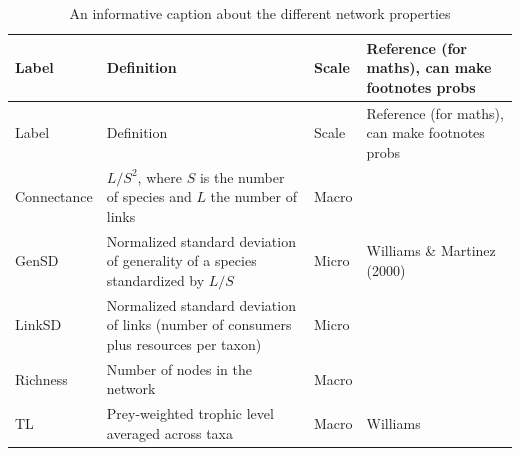 \documentclass[
]{article}
\begin{document}
\begin{longtable}[]{@{}
  >{\raggedright\arraybackslash}p{}
  >{\raggedright\arraybackslash}p{}
  >{\raggedright\arraybackslash}p{}
  >{\raggedright\arraybackslash}p{}@{}}
\caption{An informative caption about the different network
properties}\label{tbl-properties}\tabularnewline
\toprule\noalign{}
\begin{minipage}[b]{\linewidth}\raggedright
Label
\end{minipage} & \begin{minipage}[b]{\linewidth}\raggedright
Definition
\end{minipage} & \begin{minipage}[b]{\linewidth}\raggedright
Scale
\end{minipage} & \begin{minipage}[b]{\linewidth}\raggedright
Reference (for maths), can make footnotes probs
\end{minipage} \\
\midrule\noalign{}
\endfirsthead
\toprule\noalign{}
\begin{minipage}[b]{\linewidth}\raggedright
Label
\end{minipage} & \begin{minipage}[b]{\linewidth}\raggedright
Definition
\end{minipage} & \begin{minipage}[b]{\linewidth}\raggedright
Scale
\end{minipage} & \begin{minipage}[b]{\linewidth}\raggedright
Reference (for maths), can make footnotes probs
\end{minipage} \\
\midrule\noalign{}
\endhead
\bottomrule\noalign{}
\endlastfoot
Connectance & \(L/S^2\), where \(S\) is the number of species and \(L\)
the number of links & Macro & \\
GenSD & Normalized standard deviation of generality of a species
standardized by \(L/S\) & Micro & Williams \& Martinez (2000) \\
LinkSD & Normalized standard deviation of links (number of consumers
plus resources per taxon) & Micro & \\
Richness & Number of nodes in the network & Macro & \\
TL & Prey-weighted trophic level averaged across taxa & Macro & Williams

\end{longtable}
\end{document}
